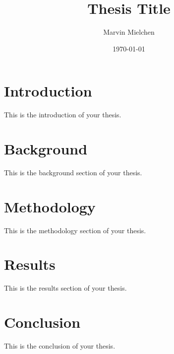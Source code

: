 \documentclass{report}
\title{Thesis Title}
\author{Marvin Mielchen}
\date{\today}
\begin{document}
\maketitle

\chapter{Introduction}
This is the introduction of your thesis.

\chapter{Background}
This is the background section of your thesis.

\chapter{Methodology}
This is the methodology section of your thesis.

\chapter{Results}
This is the results section of your thesis.

\chapter{Conclusion}
This is the conclusion of your thesis.
\end{document}
